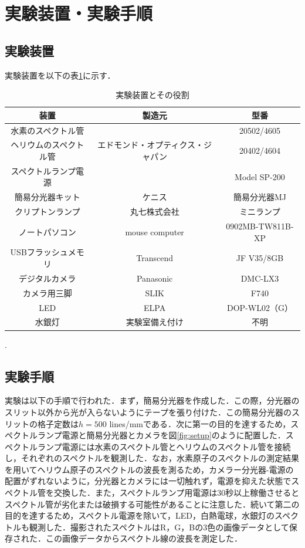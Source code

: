 \documentclass[a4paper,dvipdfmx,10.5pt]{jarticle}
\begin{document}
\section{実験装置・実験手順}
\subsection{実験装置}
実験装置を以下の表\ref{tab:experimental_setup}に示す．
\begin{table}[htbp]
 \begin{center}
  \begin{tabular}{|c|c|c|}
    \hline
   装置 & 製造元 & 型番 \\
    \hline
   水素のスペクトル管 &&20502/4605\\
    ヘリウムのスペクトル管 &エドモンド・オプティクス・ジャパン&20402/4604\\
    スペクトルランプ電源 &&Model SP-200\\
   \hline
   簡易分光器キット & ケニス & 簡易分光器MJ\\
   クリプトンランプ& 丸七株式会社 & ミニランプ\\
   ノートパソコン& mouse computer & 0902MB-TW811B-XP\\
   USBフラッシュメモリ& Transcend & JF V35/8GB\\
   デジタルカメラ& Panasonic & DMC-LX3\\
   カメラ用三脚& SLIK & F740 \\
   LED & ELPA & DOP-WL02（G）  \\
   水銀灯 & 実験室備え付け & 不明 \\
   \hline
  \end{tabular}
  \caption{実験装置とその役割}
  .\label{tab:experimental_setup}
 \end{center}
\end{table}
\subsection{実験手順}
実験は以下の手順で行われた．まず，簡易分光器を作成した．この際，分光器のスリット以外から光が入らないようにテープを張り付けた．この簡易分光器のスリットの格子定数は$h = 500$ lines/mmである．次に第一の目的を達するため，スペクトルランプ電源と簡易分光器とカメラを図\ref{fig:setup}のように配置した．スペクトルランプ電源には水素のスペクトル管とヘリウムのスペクトル管を接続し，それぞれのスペクトルを観測した．なお，水素原子のスペクトルの測定結果を用いてヘリウム原子のスペクトルの波長を測るため，カメラー分光器-電源の配置がずれないように，分光器とカメラには一切触れず，電源を抑えた状態でスペクトル管を交換した．また，スペクトルランプ用電源は30秒以上稼働させるとスペクトル管が劣化または破損する可能性があることに注意した．続いて第二の目的を達するため，スペクトル電源を除いて，LED，白熱電球，水銀灯のスペクトルも観測した．撮影されたスペクトルはR，G，Bの3色の画像データとして保存された．この画像データからスペクトル線の波長を測定した．
\end{document}
